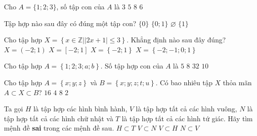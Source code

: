 \begin{ex}%
	Cho $A=\{1;2;3\}$, số tập con của  $A$ là
	\choice 
		 {$3$}
		{$5$} 
		 {\True $8$}
		{$6$} 
\end{ex}

\begin{ex}%
	 Tập hợp nào sau đây có đúng một tập con?
	 \choice
		{$\{0\}$} 
		{$\{0;1\}$} 
		 {\True $\varnothing$}
		 {$\{1\}$}
\end{ex}

\begin{ex}%
	Cho tập hợp $X = \left\{x \in \mathbb{Z}\big| \left|2x + 1\right| \le 3\right\}$. Khẳng định  nào sau đây đúng?
	 \choice
		{$X = \left(-2;1\right)$} 
		{$X  = \left[-2;1\right]$}
		 {$X = \left\{-2;1\right\}$}
		{\True  $X = \left\{-2;-1;0;1\right\}$}
\end{ex}

\begin{ex}%
	Cho tập  hợp $A=\left\{1;2;3;a;b \right\}$. Số tập hợp con của $A$ là
	 \choice
		 {$5$}
		 {$8$}
		{\True$32$} 
		 {$10$}
\end{ex}

\begin{ex}%
	Cho tập hợp $A=\left\{x;y;z\right\}$ và  $B=\left\{x;y;z;t;u\right\}$. Có bao nhiêu tập $X$ thỏa mãn \break $A\subset X\subset B$?
	 \choice
		 {$16$}
		{\True  $4$}
		{$8$} 
		{$2$} 
\end{ex}

\begin{ex}%
	Ta gọi $H$ là tập hợp các hình bình hành, $V$ là tập hợp tất cả các hình vuông, $N$ là tập hợp tất cả các hình chữ nhật  và $T$ là tập hợp tất cả các hình tứ giác. Hãy tìm mệnh đề \textbf{sai} trong các mệnh đề sau.
	\choice 
		{$H\subset  T$}
		 {$V\subset N$}
		{$V\subset H$} 
		{\True  $N\subset V$}
\end{ex}

